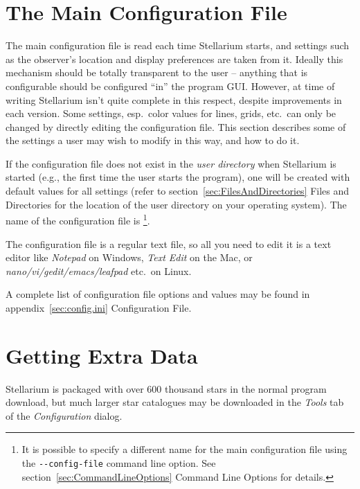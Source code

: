 \section{The Main Configuration File}
\label{the-main-configuration-file}
\label{sec:ConfigurationFile}

The main configuration file is read each time Stellarium starts, and
settings such as the observer's location and display preferences are
taken from it. Ideally this mechanism should be totally transparent to
the user -- anything that is configurable should be configured ``in'' the
program GUI. However, at time of writing Stellarium isn't quite complete
in this respect, despite improvements in each version. Some settings, 
esp.\ color values for lines, grids, etc.\ 
can only be changed by directly editing the configuration file. This
section describes some of the settings a user may wish to modify in this
way, and how to do it.

If the configuration file does not exist in the \emph{user directory}
when Stellarium is started (e.g., the first time the user starts the
program), one will be created with default values for all settings
(refer to section~\ref{sec:FilesAndDirectories} Files and
Directories for the location of the user directory on your operating
system). The name of the configuration file is
\footnote{It is possible to specify a different name
  for the main configuration file using the \texttt{-\/-config-file}
  command line option. See section~\ref{sec:CommandLineOptions} Command 
  Line Options for details.}.

The configuration file is a regular text file, so all you need to edit
it is a text editor like \emph{Notepad} on Windows, \emph{Text Edit} on
the Mac, or \emph{nano/vi/gedit/emacs/leafpad} etc.\ on Linux.

A complete list of configuration file options and values may be found
in appendix~\ref{sec:config.ini} Configuration File.



\section{Getting Extra Data}
\label{sec:ExtraData}

Stellarium is packaged with over 600 thousand stars in the normal
program download, but much larger star catalogues may be downloaded
in the \emph{Tools} tab of the \emph{Configuration} dialog.


